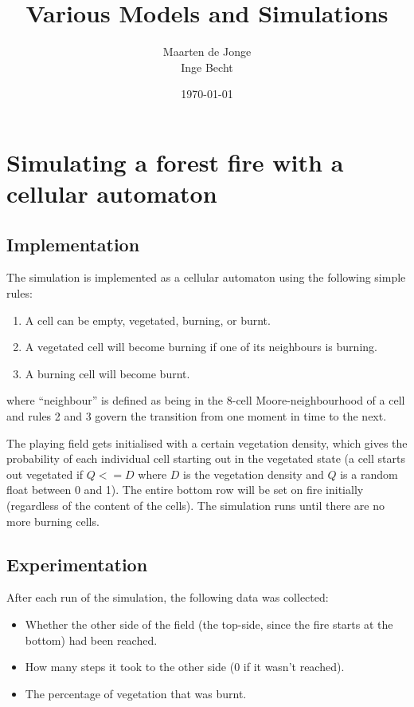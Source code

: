 \documentclass[a4paper]{report}
\author{Maarten de Jonge \\
        Inge Becht}
\date{\today}
\title{Various Models and Simulations}
\begin{document}
\maketitle

\chapter{Simulating a forest fire with a cellular automaton}
\label{cha:ff}

\section{Implementation} 
\label{sec:ff_impl}

The simulation is implemented as a cellular automaton using the following simple
rules:
\begin{enumerate}
    \item A cell can be empty, vegetated, burning, or burnt.
    \item A vegetated cell will become burning if one of its neighbours is
          burning.
    \item A burning cell will become burnt.
\end{enumerate}
where ``neighbour'' is defined as being in the 8-cell Moore-neighbourhood of a
cell and rules 2 and 3 govern the transition from one moment in time to the
next.

The playing field gets initialised with a certain vegetation density, which
gives the probability of each individual cell starting out in the vegetated
state (a cell starts out vegetated if $Q <= D$ where $D$ is the vegetation
density and $Q$ is a random float between 0 and 1). The entire bottom row will
be set on fire initially (regardless of the content of the cells). The
simulation runs until there are no more burning cells.


\section{Experimentation} 
\label{sec:ff_exp}

After each run of the simulation, the following data was collected:
\begin{itemize}
    \item Whether the other side of the field (the top-side, since the fire
        starts at the bottom) had been reached.
    \item How many steps it took to the other side (0 if it wasn't reached).
    \item The percentage of vegetation that was burnt.
\end{itemize}
\end{document}
